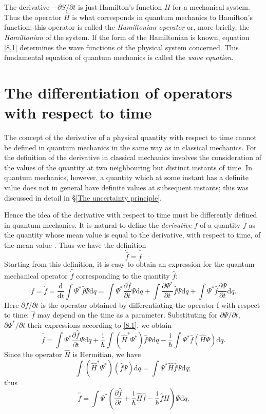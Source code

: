The derivative $ -{\partial S}/{\partial t} $ is just Hamilton’s function $ H $ for a mechanical system. Thus the operator $ \hat{H} $ is what corresponds in quantum mechanics to Hamilton’s function; this operator is called the \textit{Hamiltonian operator} or, more briefly, the \textit{Hamiltonian} of the system. If the form of the Hamiltonian is known, equation \eqref{8.1} determines the wave functions of the physical system concerned. This fundamental equation of quantum mechanics is called the \textit{wave equation}.
\section{The differentiation of operators with respect to time}\label{The differentiation of operators with respect to time}

The concept of the derivative of a physical quantity with respect to time cannot be defined in quantum mechanics in the same way as in classical mechanics. For the definition of the derivative in classical mechanics involves the consideration of the values of the quantity at two neighbouring but distinct instants of time. In quantum mechanics, however, a quantity which at some instant has a definite value does not in general have definite values at subsequent instants; this was discussed in detail in \S\ref{The uncertainty principle}.

Hence the idea of the derivative with respect to time must be differently defined in quantum mechanics. It is natural to define the \textit{derivative} $ \dot{f} $ of a quantity $ f $ as the quantity whose mean value is equal to the derivative, with respect to time, of the mean value . Thus we have the definition
\begin{equation}\label{9.1}
\dot{\bar{f}}=\bar{\dot{f}}
\end{equation}
Starting from this definition, it is easy to obtain an expression for the quantum-mechanical operator $ \hat{\dot{f}} $ corresponding to the quantity $ \hat{f} $:
\[ \dot{\bar{f}}=\bar{\dot{f}}=\frac{\mathrm{d}}{\mathrm{d}t}\int\Psi^*\hat{f}\Psi\mathrm{d}q=\int\Psi^*\frac{\partial\hat{f}}{\partial t}\Psi\mathrm{d}q+\int\frac{\partial\Psi^*}{\partial t}\hat{f}\Psi\mathrm{d}q+\int\Psi^*\hat{f}\frac{\partial\Psi}{\partial t}\mathrm{d}q. \]
Here $ \partial f/\partial t $ is the operator obtained by differentiating the operator f with respect to time; $ \hat{f} $ may depend on the time as a parameter. Substituting for $ \partial\Psi/\partial t $, $ \partial\Psi^*/\partial t $ their expressions according to \eqref{8.1}, we obtain
\[ \bar{\dot{f}}=\int\Psi^*\frac{\partial\hat{f}}{\partial t}\Psi\mathrm{d}q+\frac{\mathrm{i}}{\hbar}\int(\hat{H}^*\Psi^*)\hat{f}\Psi\mathrm{d}q-\frac{\mathrm{i}}{\hbar}\int\Psi^*\hat{f}(\hat{H}\Psi)\mathrm{d}q. \]
Since the operator $ \hat{H} $ is Hermitian, we have
\[ \int(\hat{H}^*\Psi^*)(\hat{f}\Psi)\mathrm{d}q=\int\Psi^*\hat{H}\hat{f}\Psi\mathrm{d}q; \]
thus
\[ \bar{\dot{f}}=\int\Psi^*\left( \frac{\partial\hat{f}}{\partial t}+\frac{\mathrm{i}}{\hbar}\hat{H}\hat{f}-\frac{\mathrm{i}}{\hbar}\hat{f}\hat{H} \right)\Psi\mathrm{d}q. \]



